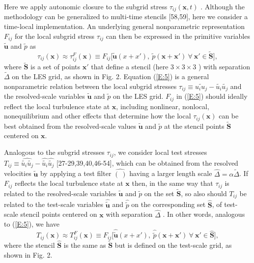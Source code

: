 Here we apply autonomic closure to the subgrid stress  $\tau_{ij}(\mathbf{x},t)$ . Although the methodology can be generalized to multi-time stencils [58,59], here we consider a time-local implementation. An underlying general nonparametric representation  $F_{ij}$ for the local subgrid stress $\tau_{ij}$  can then be expressed in the primitive variables $\widetilde{\mathbf{u}}$  and  ${\widetilde{p}}$  as
%
\begin{equation}
	\label{E:5}
	\tau_{ij}(\mathbf{x}) \approx  \tau_{ij}^{F}(\mathbf{x})
	\equiv F_{ij} \big[ \widetilde{\mathbf{u}}(x + x'), \ \widetilde{p}\mathbf{(x + x')}
	\ \forall \ \mathbf{x'} \in \widetilde{\mathbf{S}} \big], 
\end{equation}
%
%                             
where ${\widetilde{\mathbf{S}}}$  is a set of points $\mathbf{x'}$  that define a stencil (here $3\times3\times3$ ) with separation $\widetilde{\Delta}$   on the LES grid, as shown in Fig. 2. Equation (\ref{E:5}) is a general nonparametric relation between the local subgrid stresses $\tau_{ij} \equiv \widetilde{u_iu_j} - \widetilde{u_i} \widetilde{u_j}$  and the resolved-scale variables $\widetilde{\mathbf{u}}$  and ${\widetilde{p}}$  on the LES grid.  $F_{ij}$ in (\ref{E:5}) should ideally reflect the local turbulence state at $\mathbf{x}$, including nonlinear, nonlocal, nonequilibrium and other effects that determine how the local $\tau_{ij}(\mathbf{x})$  can be best obtained from the resolved-scale values   $\widetilde{\mathbf{u}}$  and  ${\widetilde{p}}$   at the stencil points ${\widetilde{\mathbf{S}}}$   centered on $\mathbf{x}$.

Analogous to the subgrid stresses  $\tau_{ij}$, we consider local test stresses  $T_{ij} \equiv \widehat{\widetilde{u_i} \widetilde{u_j}} - \widehat{\widetilde{u_i}}\widehat{\widetilde{u_j}}$ [27-29,39,40,46-54], which can be obtained from the resolved velocities  $\widetilde{\mathbf{u}} $ by applying a test filter $\widehat{(\  )}$  having a larger length scale  $\widehat{\Delta} = \alpha \widetilde{\Delta}$. If $F_{ij}$  reflects the local turbulence state at $\mathbf{x}$ then, in the same way that  $\tau_{ij}$ is related to the resolved-scale variables   $\widetilde{\mathbf{u}}$  and  ${\widetilde{p}}$  on the set  ${\widetilde{\mathbf{S}}}$, so also should $T_{ij}$  be related to the test-scale variables   $\widehat{\widetilde{\mathbf{u}}}$  and  $\widehat{{\widetilde{p}}}$   on the corresponding set ${\widehat{\mathbf{S}}}$,  of test-scale stencil points centered on $\mathbf{x}$  with separation $\widehat{\Delta}$ . In other words, analogous to (\ref{E:5}), we have
%
\begin{equation}
	\label{E:6}
	T_{ij}(\mathbf{x}) \approx  T_{ij}^{F}(\mathbf{x})
	\equiv F_{ij} \big[ \widehat{\widetilde{\mathbf{u}}}(x + x'), \ \widehat{\widetilde{p}}\mathbf{(x + x')}
	\ \forall \ \mathbf{x'} \in \widehat{\mathbf{S}} \big], 
\end{equation}
%
%         
where the stencil  ${\widehat{\mathbf{S}}}$ is the same as ${\widetilde{\mathbf{S}}}$  but is defined on the test-scale grid, as shown in Fig. 2. 

